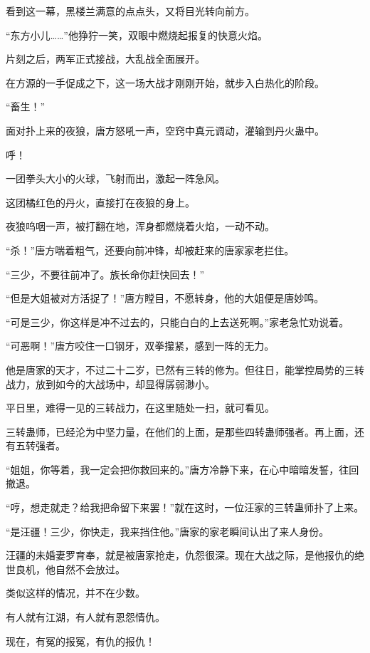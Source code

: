 \begin{this_body}
看到这一幕，黑楼兰满意的点点头，又将目光转向前方。

“东方小儿……”他狰狞一笑，双眼中燃烧起报复的快意火焰。

片刻之后，两军正式接战，大乱战全面展开。

在方源的一手促成之下，这一场大战才刚刚开始，就步入白热化的阶段。

“畜生！”

面对扑上来的夜狼，唐方怒吼一声，空窍中真元调动，灌输到丹火蛊中。

呼！

一团拳头大小的火球，飞射而出，激起一阵急风。

这团橘红色的丹火，直接打在夜狼的身上。

夜狼呜咽一声，被打翻在地，浑身都燃烧着火焰，一动不动。

“杀！”唐方喘着粗气，还要向前冲锋，却被赶来的唐家家老拦住。

“三少，不要往前冲了。族长命你赶快回去！”

“但是大姐被对方活捉了！”唐方瞠目，不愿转身，他的大姐便是唐妙鸣。

“可是三少，你这样是冲不过去的，只能白白的上去送死啊。”家老急忙劝说着。

“可恶啊！”唐方咬住一口钢牙，双拳攥紧，感到一阵的无力。

他是唐家的天才，不过二十二岁，已然有三转的修为。但往日，能掌控局势的三转战力，放到如今的大战场中，却显得孱弱渺小。

平日里，难得一见的三转战力，在这里随处一扫，就可看见。

三转蛊师，已经沦为中坚力量，在他们的上面，是那些四转蛊师强者。再上面，还有五转强者。

“姐姐，你等着，我一定会把你救回来的。”唐方冷静下来，在心中暗暗发誓，往回撤退。

“哼，想走就走？给我把命留下来罢！”就在这时，一位汪家的三转蛊师扑了上来。

“是汪疆！三少，你快走，我来挡住他。”唐家的家老瞬间认出了来人身份。

汪疆的未婚妻罗育奉，就是被唐家抢走，仇怨很深。现在大战之际，是他报仇的绝世良机，他自然不会放过。

类似这样的情况，并不在少数。

有人就有江湖，有人就有恩怨情仇。

现在，有冤的报冤，有仇的报仇！

\end{this_body}

